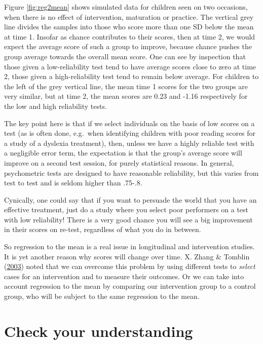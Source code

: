 \documentclass{krantz}
\begin{document}
Figure \ref{fig:reg2mean} shows simulated data for children seen on two occasions, when there is no effect of intervention, maturation or practice. The vertical grey line divides the samples into those who score more than one SD below the mean at time 1. Insofar as chance contributes to their scores, then at time 2, we would expect the average score of such a group to improve, because chance pushes the group average towards the overall mean score. One can see by inspection that those given a low-reliability test tend to have average scores close to zero at time 2, those given a high-reliability test tend to remain below average. For children to the left of the grey vertical line, the mean time 1 scores for the two groups are very similar, but at time 2, the mean scores are 0.23 and -1.16 respectively for the low and high reliability tests.

The key point here is that if we select individuals on the basis of low scores on a test (as is often done, e.g.~when identifying children with poor reading scores for a study of a dyslexia treatment), then, unless we have a highly reliable test with a negligible error term, the expectation is that the group's average score will improve on a second test session, for purely statistical reasons. In general, psychometric tests are designed to have reasonable reliability, but this varies from test to test and is seldom higher than .75-.8.

Cynically, one could say that if you want to persuade the world that you have an effective treatment, just do a study where you select poor performers on a test with low reliability! There is a very good chance you will see a big improvement in their scores on re-test, regardless of what you do in between.

So regression to the mean is a real issue in longitudinal and intervention studies. It is yet another reason why scores will change over time. X. Zhang \& Tomblin (\protect\hyperlink{ref-zhang2003}{2003}) noted that we can overcome this problem by using different tests to \emph{select} cases for an intervention and to measure their outcomes. Or we can take into account regression to the mean by comparing our intervention group to a control group, who will be subject to the same regression to the mean.

\hypertarget{check-your-understanding-4}{%
\section{Check your understanding}\label{check-your-understanding-4}}
\end{document}
